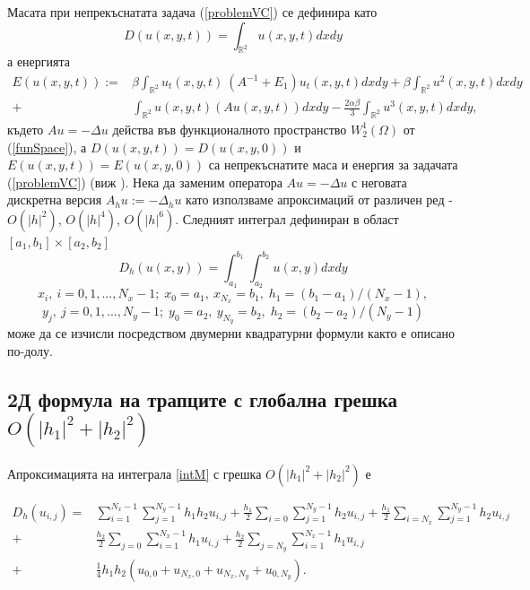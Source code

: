 \documentclass{article}
\newcommand{\rf}[1]{(\ref{#1})}
\newcommand{\RR}{\mathbb{R}}
\begin{document}
Масата при непрекъснатата задача \rf{problemVC} се дефинира като
\begin{equation}\label{intM}
D(u(x,y,t))=\int_{\RR^2} u(x,y,t)dx dy
\end{equation}
а енергията 
\begin{align}\label{ex-en}
E(u(x,y,t)):=&\beta \int_{\RR^2} u_t(x,y,t) \: \left(A^{-1}+E_1\right)u_t(x,y,t) dxdy+
\beta \int_{\RR^2} u^2(x,y,t) dxdy \nonumber\\
+& \int_{\RR^2}u(x,y,t) \left(A u(x,y,t)\right) dxdy
-\frac{2 \alpha \beta}{3} \int_{\RR^2} u^3(x,y,t) dxdy,
\end{align}
където $Au=-\Delta u$ действа във функционалното пространство $W^1_2(\Omega)$ от \rf{funSpace}, а $D(u(x,y,t)) = D(u(x,y,0))$ и $E(u(x,y,t)) = E(u(x,y,0))$ са непрекъснатите маса и енергия за задачата \rf{problemVC} (виж \cite{ref1}). Нека да заменим оператора $Au=-\Delta u$ с неговата дискретна версия $A_hu :=-\Delta_h u$ като използваме апроксимаций от различен ред - $O(|h|^2)$, $O(|h|^4)$, $O(|h|^6)$.
Следният интеграл дефиниран в област $[a_1, b_1] \times [a_2, b_2]$
\begin{equation}\label{int}
D_h(u(x,y))=\int_{a_1}^{b_1} \int_{a_2}^{b_2} u(x,y)dx dy
\end{equation}
$$x_i, ~i=0,1,...,N_x-1; \;x_0=a_1,~x_{N_x}=b_1, \;h_1=(b_1-a_1)/(N_x-1),$$
$$y_j, ~j=0,1,...,N_y-1; \; y_0=a_2,~y_{N_y}=b_2, \;h_2=(b_2-a_2)/(N_y-1)$$
може да се изчисли посредством двумерни квадратурни формули както е описано по-долу.

\subsection{ 2Д формула на трапците с глобална грешка $O(|h_1|^2+|h_2|^2)$ }

Апроксимацията на интеграла \eqref{intM} с грешка $O(|h_1|^2+|h_2|^2)$ е

\begin{align}\label{quadr2}
D_h(u_{i,j}) =& \sum_{i=1}^{N_x-1} \sum_{j=1}^{N_y-1} h_1 h_2 u_{i,j}
+\frac{h_1}{2}\sum_{i=0} \sum_{j=1}^{N_y-1} h_2 u_{i,j}
+\frac{h_1}{2}\sum_{i=N_x} \sum_{j=1}^{N_y-1} h_2 u_{i,j} \nonumber\\
+&\frac{h_2}{2}\sum_{j=0} \sum_{i=1}^{N_x-1} h_1 u_{i,j}
+\frac{h_2}{2}\sum_{j=N_y} \sum_{i=1}^{N_x-1} h_1 u_{i,j}
\nonumber\\
+&\frac{1}{4}h_1 h_2 \left(u_{0,0}+u_{N_x,0}+u_{N_x,N_y}+u_{0,N_y}
\right).
\end{align}
\end{document}
